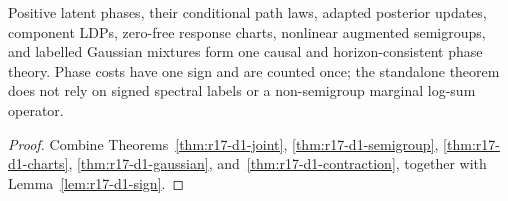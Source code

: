 \begin{theorem}
\label{thm:r17-d1-main}
Positive latent phases, their conditional path laws, adapted posterior
updates, component LDPs, zero-free response charts, nonlinear augmented
semigroups, and labelled Gaussian mixtures form one causal and
horizon-consistent phase theory.  Phase costs have one sign and are counted
once; the standalone theorem does not rely on signed spectral labels or a
non-semigroup marginal log-sum operator.
\end{theorem}

\begin{proof}
Combine Theorems~\ref{thm:r17-d1-joint},
\ref{thm:r17-d1-semigroup}, \ref{thm:r17-d1-charts},
\ref{thm:r17-d1-gaussian}, and~\ref{thm:r17-d1-contraction}, together with
Lemma~\ref{lem:r17-d1-sign}.
\end{proof}

